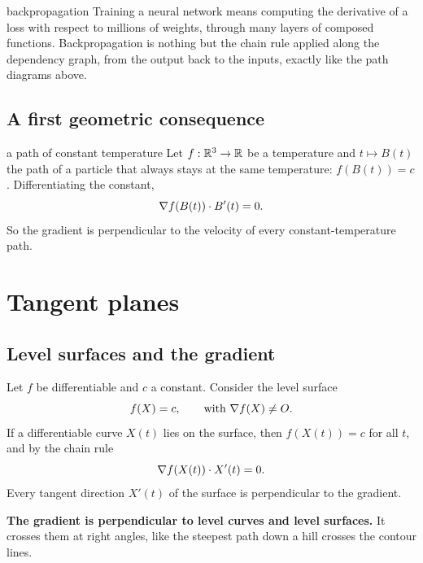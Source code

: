 \begin{reallife}{backpropagation}
Training a neural network means computing the derivative of a loss with respect to
millions of weights, through many layers of composed functions. Backpropagation is
nothing but the chain rule applied along the dependency graph, from the output back to
the inputs, exactly like the path diagrams above.
\end{reallife}

\subsection{A first geometric consequence}

\begin{example}{a path of constant temperature}
Let $f:\mathbb{R}^3\to\mathbb{R}$ be a temperature and $t\mapsto B(t)$ the path of a particle that
always stays at the same temperature: $f(B(t))=c$. Differentiating the constant,
\[ \nabla f(B(t))\cdot B'(t)=0 . \]
So the gradient is perpendicular to the velocity of every constant-temperature path.
\end{example}

\section{Tangent planes}

\subsection{Level surfaces and the gradient}

Let $f$ be differentiable and $c$ a constant. Consider the level surface
\[ f(X)=c,\qquad\text{with }\nabla f(X)\neq O . \]
If a differentiable curve $X(t)$ lies on the surface, then $f(X(t))=c$ for all $t$, and
by the chain rule
\[ \nabla f(X(t))\cdot X'(t)=0 . \]
Every tangent direction $X'(t)$ of the surface is perpendicular to the gradient.

\begin{keyidea}
\textbf{The gradient is perpendicular to level curves and level surfaces.} It crosses them
at right angles, like the steepest path down a hill crosses the contour lines.
\end{keyidea}

